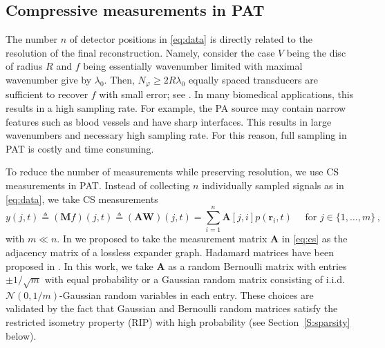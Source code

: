 \documentclass[11pt]{article}
\newcommand{\rr}{\mathbf r}
\newcommand{\data}{y}
\newcommand{\source}{f}
\newcommand{\set}[1]{\{#1\}}
\newcommand{\fullop}{\mathbf M}
\newcommand{\wave}{\mathbf W}
\newcommand{\Am}{\mathbf A}
\begin{document}
\subsection{Compressive  measurements in PAT}

The number $n$ of detector positions in  \eqref{eq:data} is directly related to the resolution of the final reconstruction. Namely, consider the case $V$ being the
disc of radius $R$ and $\source$ being essentially  wavenumber limited with maximal wavenumber
give by $\lambda_0$. Then, $N_\varphi \geq 2 R \lambda_0$ equally spaced transducers are sufficient to recover $\source$ with small error; see \cite{haltmeier2016sampling}. In  many biomedical applications, this results in a high  sampling rate. For example, the PA source may contain narrow features such as blood vessels and have sharp interfaces. This  results in large wavenumbers and necessary high sampling rate. For this reason, full sampling  in PAT is costly and time consuming.

To reduce the number of measurements  while  preserving resolution,  we use CS measurements in PAT. Instead of collecting $n$
individually sampled signals as in \eqref{eq:data}, we take CS
measurements
\begin{equation} \label{eq:cs}
\data(j, t)
\triangleq
(\fullop \source)(j, t)
\triangleq
(\Am \wave)(j, t)
=	\sum_{i=1}^n 	
\Am[j, i] p(\rr_i, t)
\quad \text{ for } j \in \set{  1, \dots, m} \,,
\end{equation}
with  $m \ll n$.
In \cite{burgholzer2016sparsifying,sandbichler2015novel}  we proposed to take the
measurement matrix $\Am$  in \eqref{eq:cs}  as the adjacency matrix of a lossless expander graph. Hadamard matrices have been proposed in
\cite{betcke2016acoustic,huynh2016single}. In this work, we  take $\Am$ as a random Bernoulli matrix with entries $\pm 1/\sqrt{m}$ with equal probability or a Gaussian random matrix consisting of i.i.d. $\mathcal{N}(0,{1}/{{m}})$-Gaussian random variables in each entry. These choices are validated by the fact that Gaussian and Bernoulli random matrices satisfy the restricted isometry property (RIP) with high probability (see Section~\ref{S:sparsity} below).
\end{document}
